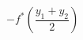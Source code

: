 \documentclass[preview]{standalone}
\begin{document}
\begin{center}
$-f^*(\dfrac{y_1 + y_2}{2})$
\end{center}
\end{document}
